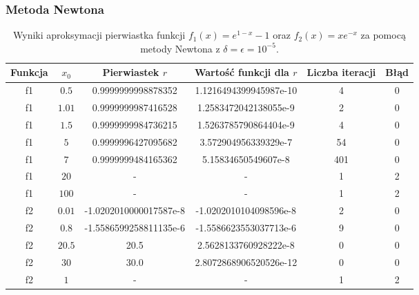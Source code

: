 \documentclass{article}
\begin{document}
\subsubsection{Metoda Newtona}
\begin{table}[H]
\begin{adjustbox}{center}
\begin{tabular}{|c|c|c|c|c|c|}
    \hline
    Funkcja & $x_0$ & Pierwiastek $r$ & Wartość funkcji dla $r$ & Liczba iteracji & Błąd\\
    \hline
    f1 & $0.5$ & 0.9999999998878352 & 1.1216494399945987e-10 & 4 & 0\\
    \hline
    f1 & $1.01$ & 0.9999999987416528 & 1.2583472042138055e-9 & 2 & 0\\
    \hline
    f1 & $1.5$ & 0.9999999984736215 & 1.5263785790864404e-9 & 4 & 0\\
    \hline
    f1 & $5$ & 0.9999996427095682 & 3.572904956339329e-7 & 54 & 0\\
    \hline
    f1 & $7$ & 0.9999999484165362 & 5.15834650549607e-8 & 401 & 0\\
    \hline
    f1 & $20$ & - & - & 1 & 2\\
    \hline
    f1 & $100$ & - & - & 1 & 2\\
    \hline
    \hline
    f2 & $0.01$ & -1.0202010000017587e-8 & -1.0202010104098596e-8 & 2 & 0\\
    \hline
    f2 & $0.8$ & -1.5586599258811135e-6 & -1.5586623553037713e-6 & 9 & 0\\
    \hline
    f2 & $20.5$ & 20.5 & 2.5628133760928222e-8 & 0 & 0\\
    \hline
    f2 & $30$ & 30.0 & 2.8072868906520526e-12 & 0 & 0\\
    \hline
    f2 & $1$ & - & - & 1 & 2\\
    \hline
\end{tabular}
\end{adjustbox}
\caption{Wyniki aproksymacji pierwiastka funkcji \( f_1(x) = e^{1-x} - 1 \) oraz \( f_2(x) = x e^{-x} \) za pomocą metody Newtona z $\delta = \epsilon = 10^{-5}$.}
\end{table}
\end{document}
